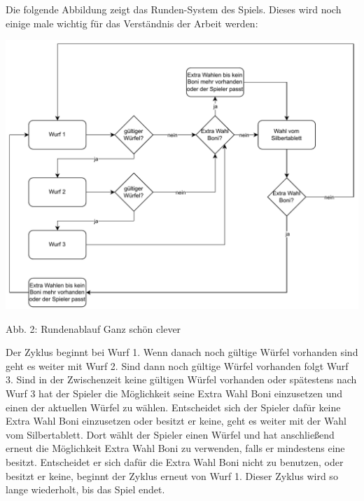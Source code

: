 \begin{minipage}{\linewidth}
Die folgende Abbildung zeigt das Runden-System des Spiels. Dieses wird noch einige male wichtig für das Verständnis der Arbeit werden:

\vspace{0.5cm}
\includegraphics[width=1\textwidth]{Bilder/Rundenablauf.drawio} 

Abb. 2: Rundenablauf Ganz schön clever\\
\end{minipage}

Der Zyklus beginnt bei Wurf 1. Wenn danach noch gültige Würfel vorhanden sind geht es weiter mit Wurf 2. Sind dann noch gültige Würfel vorhanden folgt Wurf 3. Sind in der Zwischenzeit keine gültigen Würfel vorhanden oder spätestens nach Wurf 3 hat der Spieler die Möglichkeit seine Extra Wahl Boni einzusetzen und einen der aktuellen Würfel zu wählen. Entscheidet sich der Spieler dafür keine Extra Wahl Boni einzusetzen oder besitzt er keine, geht es weiter mit der Wahl vom Silbertablett. Dort wählt der Spieler einen Würfel und hat anschließend erneut die Möglichkeit Extra Wahl Boni zu verwenden, falls er mindestens eine besitzt. Entscheidet er sich dafür die Extra Wahl Boni nicht zu benutzen, oder besitzt er keine, beginnt der Zyklus erneut von Wurf 1. Dieser Zyklus wird so lange wiederholt, bis das Spiel endet.\\


